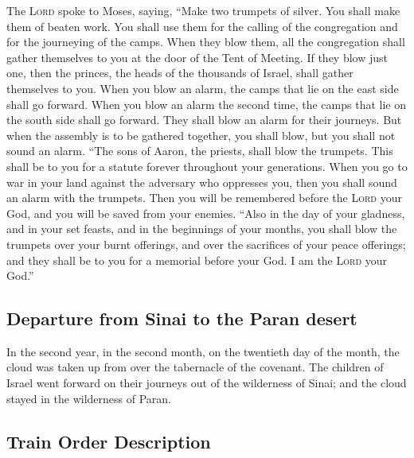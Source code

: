  The \textsc{Lord} spoke to Moses, saying, 
``Make two trumpets of silver. You shall make them of beaten work. You
shall use them for the calling of the congregation and for the
journeying of the camps.  When they blow them, all the
congregation shall gather themselves to you at the door of the Tent of
Meeting.  If they blow just one, then the princes, the
heads of the thousands of Israel, shall gather themselves to you.
 When you blow an alarm, the camps that lie on the east
side shall go forward.  When you blow an alarm the second
time, the camps that lie on the south side shall go forward. They shall
blow an alarm for their journeys.  But when the assembly
is to be gathered together, you shall blow, but you shall not sound an
alarm.  ``The sons of Aaron, the priests, shall blow the
trumpets. This shall be to you for a statute forever throughout your
generations.  When you go to war in your land against the
adversary who oppresses you, then you shall sound an alarm with the
trumpets. Then you will be remembered before the \textsc{Lord} your God,
and you will be saved from your enemies.  ``Also in the
day of your gladness, and in your set feasts, and in the beginnings of
your months, you shall blow the trumpets over your burnt offerings, and
over the sacrifices of your peace offerings; and they shall be to you
for a memorial before your God. I am the \textsc{Lord} your God.''

\hypertarget{departure-from-sinai-to-the-paran-desert}{%
\subsection{Departure from Sinai to the Paran
desert}\label{departure-from-sinai-to-the-paran-desert}}

 In the second year, in the second month, on the
twentieth day of the month, the cloud was taken up from over the
tabernacle of the covenant.  The children of Israel went
forward on their journeys out of the wilderness of Sinai; and the cloud
stayed in the wilderness of Paran.

\hypertarget{train-order-description}{%
\subsection{Train Order Description}\label{train-order-description}}

